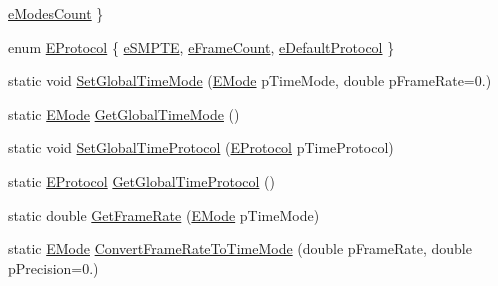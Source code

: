 \begin{DoxyCompactItemize}
\hyperlink{class_fbx_time_acc529b00a0e8d4c3da3702449ca93031adb7e6969ddc5e783443cd859d84a4c2d}{e\+Modes\+Count}
 \}
\item 
enum \hyperlink{class_fbx_time_a10ffa1fdce0aa7f63ec24bdd23afff4b}{E\+Protocol} \{ \hyperlink{class_fbx_time_a10ffa1fdce0aa7f63ec24bdd23afff4bacbfb0289f32e9646c9fd472968864b40}{e\+S\+M\+P\+TE}, 
\hyperlink{class_fbx_time_a10ffa1fdce0aa7f63ec24bdd23afff4bac289d3a9f084368221a07a3c95817bef}{e\+Frame\+Count}, 
\hyperlink{class_fbx_time_a10ffa1fdce0aa7f63ec24bdd23afff4baf6dc00e0f5e47195f617ab547aaf9b17}{e\+Default\+Protocol}
 \}
\item 
static void \hyperlink{class_fbx_time_a0bd3eab238596b63a1bc8e8ac830844b}{Set\+Global\+Time\+Mode} (\hyperlink{class_fbx_time_acc529b00a0e8d4c3da3702449ca93031}{E\+Mode} p\+Time\+Mode, double p\+Frame\+Rate=0.)
\item 
static \hyperlink{class_fbx_time_acc529b00a0e8d4c3da3702449ca93031}{E\+Mode} \hyperlink{class_fbx_time_ae5ad30ea14f534b93fb04c2966ef5ae7}{Get\+Global\+Time\+Mode} ()
\item 
static void \hyperlink{class_fbx_time_ab455ab67a792cbf5d691db58d988a905}{Set\+Global\+Time\+Protocol} (\hyperlink{class_fbx_time_a10ffa1fdce0aa7f63ec24bdd23afff4b}{E\+Protocol} p\+Time\+Protocol)
\item 
static \hyperlink{class_fbx_time_a10ffa1fdce0aa7f63ec24bdd23afff4b}{E\+Protocol} \hyperlink{class_fbx_time_af50c9f37b415366a30a62378d0fd9e0f}{Get\+Global\+Time\+Protocol} ()
\item 
static double \hyperlink{class_fbx_time_a583171e7b6351a2ae0468b03d442a1e6}{Get\+Frame\+Rate} (\hyperlink{class_fbx_time_acc529b00a0e8d4c3da3702449ca93031}{E\+Mode} p\+Time\+Mode)
\item 
static \hyperlink{class_fbx_time_acc529b00a0e8d4c3da3702449ca93031}{E\+Mode} \hyperlink{class_fbx_time_aac990ffad2cf969b6c1003cce20087e5}{Convert\+Frame\+Rate\+To\+Time\+Mode} (double p\+Frame\+Rate, double p\+Precision=0.)
\end{DoxyCompactItemize}
